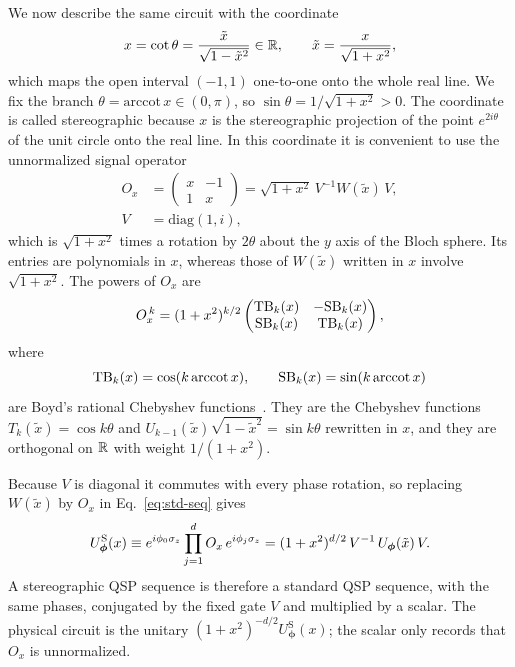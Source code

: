 We now describe the same circuit with the coordinate
\begin{equation}
	x=\cot\theta=\frac{\tilde x}{\sqrt{1-\tilde x^2}}\in\mathbb{R},
	\qquad \tilde x=\frac{x}{\sqrt{1+x^2}},
	\label{eq:stereo-coord}
\end{equation}
which maps the open interval $(-1,1)$ one-to-one onto the whole
real line.  We fix the branch $\theta=\mathrm{arccot}\,x\in(0,\pi)$,
so $\sin\theta=1/\sqrt{1+x^2}>0$.  The coordinate is called
stereographic because $x$ is the stereographic projection of the
point $e^{2i\theta}$ of the unit circle onto the real line.  In this coordinate it is
convenient to use the unnormalized signal operator
\begin{equation}
	\begin{split}
		O_x&=\begin{pmatrix} x & -1 \\ 1 & x\end{pmatrix}
		=\sqrt{1+x^2}\,V^{-1}W(\tilde x)\,V,\\
		V&=\mathrm{diag}(1,i),
	\end{split}
	\label{eq:Ox}
\end{equation}
which is $\sqrt{1+x^2}$ times a rotation by $2\theta$ about the
$y$ axis of the Bloch sphere.  Its entries are polynomials in $x$, whereas those of
$W(\tilde x)$ written in $x$ involve $\sqrt{1+x^2}$.  The powers of
$O_x$ are
\begin{equation}
	O_x^{\,k}=(1+x^2)^{k/2}
	\begin{pmatrix}\mathrm{TB}_k(x) & -\mathrm{SB}_k(x)\\
		\mathrm{SB}_k(x) & \mathrm{TB}_k(x)\end{pmatrix},
	\label{eq:Ox-power}
\end{equation}
where
\begin{equation}
	\mathrm{TB}_k(x)=\cos(k\,\mathrm{arccot}\,x),\qquad
	\mathrm{SB}_k(x)=\sin(k\,\mathrm{arccot}\,x)
	\label{eq:rat-cheb}
\end{equation}
are Boyd's rational Chebyshev functions~\cite{Boyd1987b,Boyd1990}.
They are the Chebyshev functions $T_k(\tilde x)=\cos k\theta$ and
$U_{k-1}(\tilde x)\sqrt{1-\tilde x^2}=\sin k\theta$ rewritten in
$x$, and they are orthogonal on $\mathbb{R}$ with weight $1/(1+x^2)$.

Because $V$ is diagonal it commutes with every phase rotation, so
replacing $W(\tilde x)$ by $O_x$ in Eq.~\eqref{eq:std-seq} gives
\begin{equation}
	U^{\mathrm{S}}_{\bm\phi}(x)\equiv e^{i\phi_0\sigma_z}\prod_{j=1}^{d}
	O_x\,e^{i\phi_j\sigma_z}
	=(1+x^2)^{d/2}\,V^{-1}\,U_{\bm\phi}(\tilde x)\,V.
	\label{eq:conj}
\end{equation}
A stereographic QSP sequence is therefore a standard QSP sequence,
with the same phases, conjugated by the fixed gate $V$ and
multiplied by a scalar.  The physical circuit is the unitary
$(1+x^2)^{-d/2}U^{\mathrm{S}}_{\bm\phi}(x)$; the scalar only
records that $O_x$ is unnormalized.

